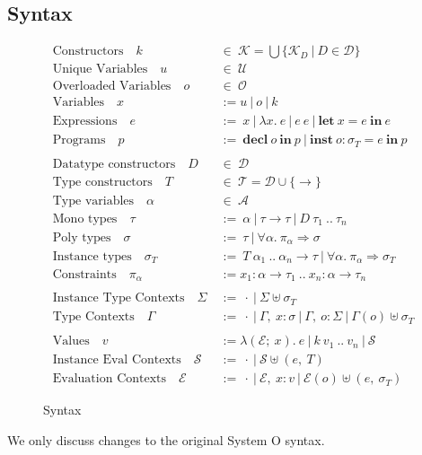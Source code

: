 \documentclass[runningheads]{llncs}
\begin{document}
\subsection{Syntax}
\begin{figure}
  \begin{align*}
    \text{Constructors} \quad k \ &\in \ \mathcal{K} = \bigcup\{\mathcal{K}_D \ | \ D \in \mathcal{D}\} \\
    \text{Unique Variables} \quad u \ &\in \ \mathcal{U}\\
    \text{Overloaded Variables} \quad o \ &\in \ \mathcal{O}\\
    \text{Variables} \quad x\ &:= u  \ | \ o  \ | \ k\\
    \text{Expressions} \quad e \ &:= \ x \ | \ \lambda x. \ e \ | \ e \ e \ | \ \textbf{let} \ x = e \ \textbf{in} \ e \\
    \text{Programs} \quad p \ &:= \ \textbf{decl} \ o \ \textbf{in} \ p \ | \ \textbf{inst} \ o :  \sigma_T  = e \ \textbf{in} \ p \\
    \\
    \text{Datatype constructors} \quad D \ &\in \ \mathcal{D} \\
    \text{Type constructors} \quad T \ &\in \ \mathcal{T} = \mathcal{D} \cup \{\rightarrow\} \\ 
    \text{Type variables} \quad \alpha \ &\in \ \mathcal{A} \\
    \text{Mono types} \quad \tau \ &:=  \ \alpha \ | \ \tau \rightarrow \tau \ | \ D \ \tau_1 \ .. \ \tau_n \\
    \text{Poly types} \quad \sigma \ &:=  \ \tau \ | \ \forall \alpha. \ \pi_\alpha \Rightarrow \sigma \\
    \text{Instance types} \quad \sigma_T \ &:= \ T \ \alpha_1 \ .. \ \alpha_n \rightarrow \tau \ | \ \forall \alpha. \ \pi_\alpha \Rightarrow \sigma_T \\  
    \text{Constraints} \quad \pi_\alpha \ &:= x_1 : \alpha \rightarrow \tau_1 \ .. \ x_n : \alpha \rightarrow \tau_n \\
    \\
    \text{Instance Type Contexts} \quad \Sigma \ &:= \ \cdot \ | \ \Sigma \uplus  \sigma_T \\
    \text{Type Contexts} \quad \Gamma \ &:= \ \cdot \ | \ \Gamma, \ x : \sigma \ | \ \Gamma, \ o : \Sigma \ | \ \Gamma(o) \uplus \sigma_T \\
    \\
    \text{Values} \quad v \ &:=  \lambda (\mathcal{E}; \ x). \ e \ | \ k \ v_1 \ .. \ v_n \ | \ \mathcal{S} \\
    \text{Instance Eval Contexts} \quad \mathcal{S} \ &:= \ \cdot \ | \ \mathcal{S} \uplus  (e ,\ T) \\
    \text{Evaluation Contexts} \quad \mathcal{E} \ &:= \ \cdot \ | \ \mathcal{E}, \ x : v  \ | \ \mathcal{E}(o) \uplus (e, \ \sigma_T)
  \end{align*}
  \caption{Syntax}
\end{figure}
\noindent We only discuss changes to the original System O syntax.
\end{document}
